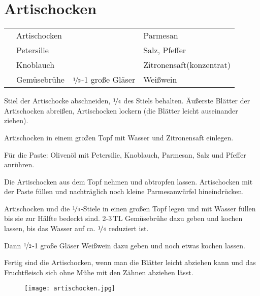 \section*{Artischocken}

\begin{centering}

\end{centering}

\begin{table}[H]
  \centering
    
  \begin{tabular*}{1\textwidth}{rlrl}
 & Artischocken & & Parmesan \\
 & Petersilie & & Salz, Pfeffer \\
 & Knoblauch & & Zitronensaft(konzentrat) \\
 & Gemüsebrühe & $\nicefrac{1}{2}$-1 große Gläser & Weißwein \\
  \end{tabular*}
\end{table}

\begin{Notes}
\item Stiel der Artischocke abschneiden, $\nicefrac{1}{4}$ des Stiels behalten. Äußerste Blätter der Artischocken abreißen, Artischocken lockern (die Blätter leicht auseinander ziehen).
\item Artischocken in einem großen Topf mit Wasser und Zitronensaft einlegen.
\item Für die Paste: Olivenöl mit Petersilie, Knoblauch, Parmesan, Salz und Pfeffer anrühren.
\item Die Artischocken aus dem Topf nehmen und abtropfen lassen. Artischocken mit der Paste füllen und nachträglich noch kleine Parmesanwürfel hineindrücken.
\item Artischocken und die $\nicefrac{1}{4}$-Stiele in einen großen Topf legen und mit Wasser füllen bis sie zur Hälfte bedeckt sind. 2-3\,TL Gemüsebrühe dazu geben und kochen lassen, bis das Wasser auf ca. $\nicefrac{1}{4}$ reduziert ist.
\item Dann $\nicefrac{1}{2}$-1 große Gläser Weißwein dazu geben und noch etwas kochen lassen.
  \item Fertig sind die Artischocken, wenn man die Blätter leicht abziehen kann und das Fruchtfleisch sich ohne Mühe mit den Zähnen abziehen lässt.
\end{Notes}
\vfill
\begin{figure}[H]
  \centering
  \texttt{[image: artischocken.jpg]}
\end{figure}
\newpage

